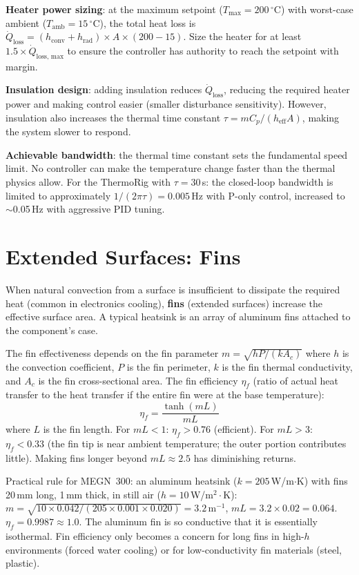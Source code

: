 \documentclass[11pt,letterpaper,twoside,openany]{book}
\newcommand{\degC}{\ensuremath{{}^{\circ}\text{C}}}
\begin{document}
\textbf{Heater power sizing}: at the maximum setpoint ($T_{\text{max}} = 200$\,\degC{}) with worst-case ambient ($T_{\text{amb}} = 15$\,\degC{}), the total heat loss is $\dot{Q}_{\text{loss}} = (h_{\text{conv}} + h_{\text{rad}}) \times A \times (200 - 15)$. Size the heater for at least $1.5 \times \dot{Q}_{\text{loss, max}}$ to ensure the controller has authority to reach the setpoint with margin.

\textbf{Insulation design}: adding insulation reduces $\dot{Q}_{\text{loss}}$, reducing the required heater power and making control easier (smaller disturbance sensitivity). However, insulation also increases the thermal time constant $\tau = mC_p/(h_{\text{eff}}A)$, making the system slower to respond.

\textbf{Achievable bandwidth}: the thermal time constant sets the fundamental speed limit. No controller can make the temperature change faster than the thermal physics allow. For the ThermoRig with $\tau = 30$\,s: the closed-loop bandwidth is limited to approximately $1/(2\pi\tau) = 0.005$\,Hz with P-only control, increased to $\sim$0.05\,Hz with aggressive PID tuning.

\section{Extended Surfaces: Fins}
When natural convection from a surface is insufficient to dissipate the required heat (common in electronics cooling), \textbf{fins} (extended surfaces) increase the effective surface area. A typical heatsink is an array of aluminum fins attached to the component's case.

The fin effectiveness depends on the fin parameter $m = \sqrt{hP/(kA_c)}$ where $h$ is the convection coefficient, $P$ is the fin perimeter, $k$ is the fin thermal conductivity, and $A_c$ is the fin cross-sectional area. The fin efficiency $\eta_f$ (ratio of actual heat transfer to the heat transfer if the entire fin were at the base temperature):
\begin{equation}
\eta_f = \frac{\tanh(mL)}{mL}
\end{equation}
where $L$ is the fin length. For $mL < 1$: $\eta_f > 0.76$ (efficient). For $mL > 3$: $\eta_f < 0.33$ (the fin tip is near ambient temperature; the outer portion contributes little). Making fins longer beyond $mL \approx 2.5$ has diminishing returns.

Practical rule for MEGN~300: an aluminum heatsink ($k = 205$\,W/m$\cdot$K) with fins 20\,mm long, 1\,mm thick, in still air ($h = 10$\,W/m$^2\cdot$K): $m = \sqrt{10 \times 0.042/(205 \times 0.001 \times 0.020)} = 3.2$\,m$^{-1}$, $mL = 3.2 \times 0.02 = 0.064$. $\eta_f = 0.9987 \approx 1.0$. The aluminum fin is so conductive that it is essentially isothermal. Fin efficiency only becomes a concern for long fins in high-$h$ environments (forced water cooling) or for low-conductivity fin materials (steel, plastic).
\end{document}
